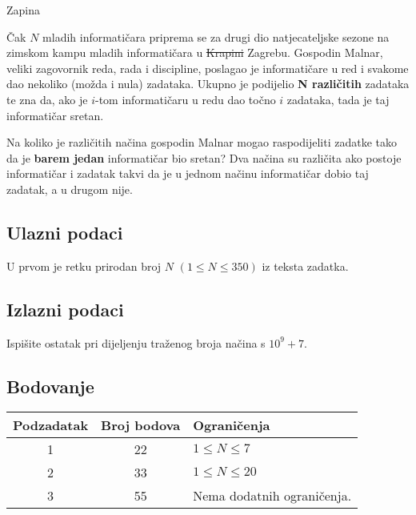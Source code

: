 \begin{statement}[
  problempoints=110,
  timelimit=1 sekunda,
  memorylimit=512 MiB,
]{Zapina}

Čak $N$ mladih informatičara priprema se za drugi dio natjecateljske sezone na
zimskom kampu mladih informatičara u \sout{Krapini} Zagrebu. Gospodin Malnar,
veliki zagovornik reda, rada i discipline, poslagao je informatičare u red i
svakome dao nekoliko (možda i nula) zadataka. Ukupno je podijelio \textbf{N
različitih} zadataka te zna da, ako je $i$-tom informatičaru u redu dao točno
$i$ zadataka, tada je taj informatičar sretan.

Na koliko je različitih načina gospodin Malnar mogao raspodijeliti zadatke tako
da je \textbf{barem jedan} informatičar bio sretan? Dva načina su različita
ako postoje informatičar i zadatak takvi da je u jednom načinu informatičar
dobio taj zadatak, a u drugom nije.

\subsection*{Ulazni podaci}
U prvom je retku prirodan broj $N$ $(1 \le N \le 350)$ iz teksta zadatka.

\subsection*{Izlazni podaci}
Ispišite ostatak pri dijeljenju traženog broja načina s $10^9+7$.

 \subsection*{Bodovanje}
{\renewcommand{\arraystretch}{1.4}
  \setlength{\tabcolsep}{6pt}
  \begin{tabular}{ccl}
 Podzadatak & Broj bodova & Ograničenja \\ \midrule
  1 & 22 & $1 \le N \le 7$ \\
  2 & 33 & $1 \le N \le 20$ \\
  3 & 55 & Nema dodatnih ograničenja.
\end{tabular}}


\end{statement}
